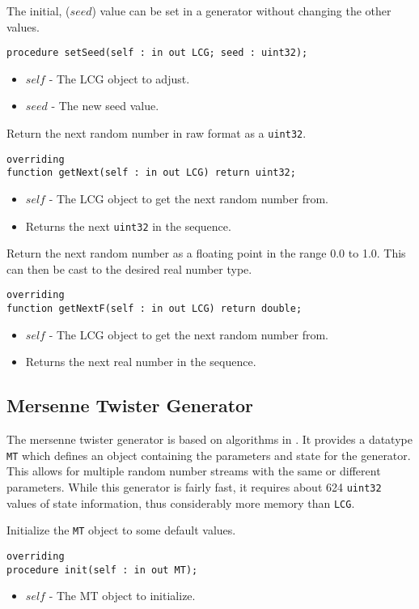 \documentclass[10pt, openany]{book}
\newcommand{\datatype}[1]{\texttt{#1}}
\begin{document}
The initial, ($seed$) value can be set in a generator without changing the other values.
\begin{lstlisting}
procedure setSeed(self : in out LCG; seed : uint32);
\end{lstlisting}
\begin{itemize}
  \item $self$ - The LCG object to adjust.
  \item $seed$ - The new seed value.
\end{itemize}

Return the next random number in raw format as a \datatype{uint32}.
\begin{lstlisting}
overriding
function getNext(self : in out LCG) return uint32;
\end{lstlisting}
\begin{itemize}
  \item $self$ - The LCG object to get the next random number from.
  \item Returns the next \datatype{uint32} in the sequence.
\end{itemize}

Return the next random number as a floating point in the range 0.0 to 1.0.  This can then be cast to the desired real number type.
\begin{lstlisting}
overriding
function getNextF(self : in out LCG) return double;
\end{lstlisting}
\begin{itemize}
  \item $self$ - The LCG object to get the next random number from.
  \item Returns the next real number in the sequence.
\end{itemize}

\subsection{Mersenne Twister Generator}
The mersenne twister generator is based on algorithms in \cite{MT19937}.  It provides a datatype \datatype{MT} which defines an object containing the parameters and state for the generator.  This allows for multiple random number streams with the same or different parameters.  While this generator is fairly fast, it requires about 624 \datatype{uint32} values of state information, thus considerably more memory than \datatype{LCG}.

Initialize the \datatype{MT} object to some default values.
\begin{lstlisting}
overriding
procedure init(self : in out MT);
\end{lstlisting}
\begin{itemize}
  \item $self$ - The MT object to initialize.
\end{itemize}
\end{document}
